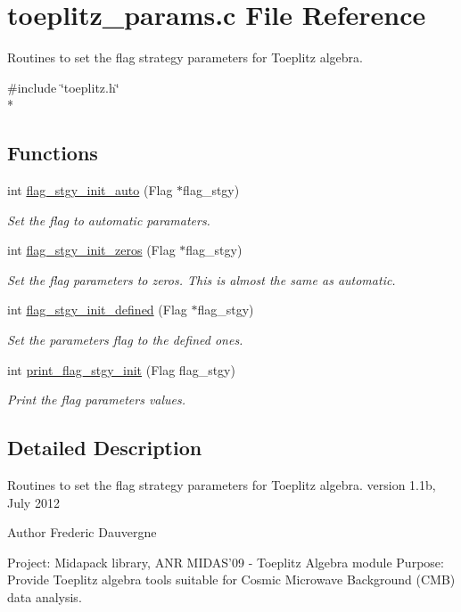 \section{toeplitz\-\_\-params.\-c File Reference}
\label{toeplitz__params_8c}


Routines to set the flag strategy parameters for Toeplitz algebra.  


{\ttfamily \#include \char`\"{}toeplitz.\-h\char`\"{}}\\*
\subsection*{Functions}
\begin{DoxyCompactItemize}
\item 
int \hyperlink{toeplitz__params_8c_a234bcc963a99bea09ed92b36c711c3ec}{flag\-\_\-stgy\-\_\-init\-\_\-auto} (Flag $\ast$flag\-\_\-stgy)
\begin{DoxyCompactList}\small\item\em Set the flag to automatic paramaters. \end{DoxyCompactList}\item 
int \hyperlink{toeplitz__params_8c_a6de858af090da4b96df6a195015ce09e}{flag\-\_\-stgy\-\_\-init\-\_\-zeros} (Flag $\ast$flag\-\_\-stgy)
\begin{DoxyCompactList}\small\item\em Set the flag parameters to zeros. This is almost the same as automatic. \end{DoxyCompactList}\item 
int \hyperlink{toeplitz__params_8c_ae334670891033aa91dd0bb7f8b707dc4}{flag\-\_\-stgy\-\_\-init\-\_\-defined} (Flag $\ast$flag\-\_\-stgy)
\begin{DoxyCompactList}\small\item\em Set the parameters flag to the defined ones. \end{DoxyCompactList}\item 
int \hyperlink{toeplitz__params_8c_a2d566ebeba6474d1bbac93315e1f578a}{print\-\_\-flag\-\_\-stgy\-\_\-init} (Flag flag\-\_\-stgy)
\begin{DoxyCompactList}\small\item\em Print the flag parameters values. \end{DoxyCompactList}\end{DoxyCompactItemize}


\subsection{Detailed Description}
Routines to set the flag strategy parameters for Toeplitz algebra. version 1.\-1b, July 2012 \begin{DoxyAuthor}{Author}
Frederic Dauvergne
\end{DoxyAuthor}
Project\-: Midapack library, A\-N\-R M\-I\-D\-A\-S'09 -\/ Toeplitz Algebra module Purpose\-: Provide Toeplitz algebra tools suitable for Cosmic Microwave Background (C\-M\-B) data analysis.

